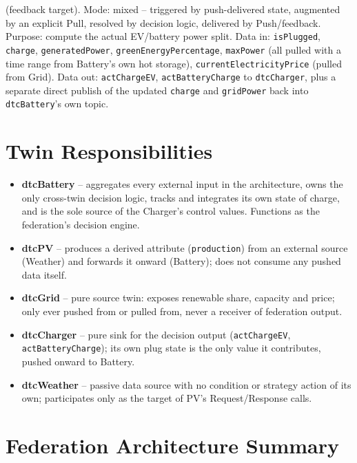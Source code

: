 \documentclass[11pt]{article}
\renewcommand{\_}{\textunderscore\allowbreak}
\begin{document}
\begin{enumerate}[leftmargin=*]
        (feedback target). Mode: mixed -- triggered by push-delivered
        state, augmented by an explicit Pull, resolved by decision logic,
        delivered by Push/feedback. Purpose: compute the actual EV/battery
        power split. Data in: \texttt{isPlugged}, \texttt{charge},
        \texttt{generatedPower}, \texttt{greenEnergyPercentage},
        \texttt{maxPower} (all pulled with a time range from Battery's own
        hot storage), \texttt{currentElectricityPrice} (pulled from Grid).
        Data out: \texttt{actChargeEV}, \texttt{actBatteryCharge} to
        \texttt{dtcCharger}, plus a separate direct publish of the updated
        \texttt{charge} and \texttt{gridPower} back into
        \texttt{dtcBattery}'s own topic.
\end{enumerate}

\section{Twin Responsibilities}

\begin{itemize}[nosep]
  \item \textbf{dtcBattery} -- aggregates every external input in the
        architecture, owns the only cross-twin decision logic, tracks and
        integrates its own state of charge, and is the sole source of the
        Charger's control values. Functions as the federation's decision
        engine.
  \item \textbf{dtcPV} -- produces a derived attribute
        (\texttt{production}) from an external source (Weather) and
        forwards it onward (Battery); does not consume any pushed data
        itself.
  \item \textbf{dtcGrid} -- pure source twin: exposes renewable share,
        capacity and price; only ever pushed from or pulled from, never a
        receiver of federation output.
  \item \textbf{dtcCharger} -- pure sink for the decision output
        (\texttt{actChargeEV}, \texttt{actBatteryCharge}); its own plug
        state is the only value it contributes, pushed onward to Battery.
  \item \textbf{dtcWeather} -- passive data source with no condition or
        strategy action of its own; participates only as the target of
        PV's Request/Response calls.
\end{itemize}

\section{Federation Architecture Summary}
\end{document}

